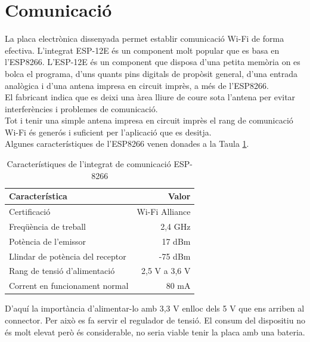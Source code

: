 \section{Comunicació}
La placa electrònica dissenyada permet establir comunicació Wi-Fi de forma efectiva. L'integrat ESP-12E és un component molt popular que es basa en l'ESP8266. L'ESP-12E és un component que disposa d'una petita memòria on es bolca el programa, d'uns quants pins digitals de propòsit general, d'una entrada analògica i d'una antena impresa en circuit imprès, a més de l'ESP8266.\\
\newline El fabricant indica que es deixi una àrea lliure de coure sota l'antena per evitar interferències i problemes de comunicació.\\
\newline Tot i tenir una simple antena impresa en circuit imprès el rang de comunicació Wi-Fi és generós i suficient per l'aplicació que es desitja.\\
\newline Algunes característiques de l'ESP8266 venen donades a la Taula \ref{tab:ESP8266}.
\begin{table}[H]
\small
\begin{center}
 \begin{tabular} {|l|r|}%
 \hline
 Característica & Valor \\
 \hline \hline 
Certificació & Wi-Fi Alliance \\ \hline
Freqüència de treball & 2,4 GHz \\ \hline
Potència de l'emissor & 17 dBm \\ \hline
Llindar de potència del receptor & -75 dBm \\ \hline
Rang de tensió d'alimentació & 2,5 V a 3,6 V \\ \hline
Corrent en funcionament normal & 80 mA \\ \hline

 \end{tabular}
 \caption{Característiques de l'integrat de comunicació ESP-8266}
 \label{tab:ESP8266}
\end{center}
\end{table}

\noindent D'aquí la importància d'alimentar-lo amb 3,3 V enlloc dels 5 V que ens arriben al connector. Per això es fa servir el regulador de tensió. El consum del dispositiu no és molt elevat però és considerable, no seria viable tenir la placa amb una bateria.

